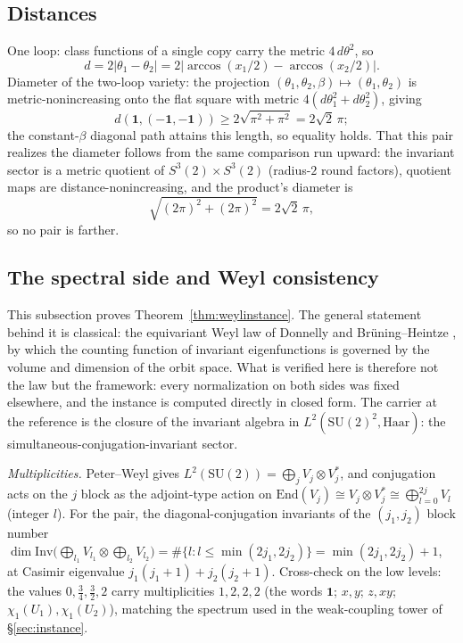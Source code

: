 \documentclass[11pt]{article}
\theoremstyle{definition}
\theoremstyle{remark}
\begin{document}
\subsection{Distances}\label{app:distances}
One loop: class functions of a single copy carry the metric
$4\,d\theta^2$, so
\[
d = 2|\theta_1 - \theta_2|
  = 2|\arccos(x_1/2) - \arccos(x_2/2)|.
\]
Diameter of the two-loop variety: the projection
$(\theta_1,\theta_2,\beta) \mapsto (\theta_1,\theta_2)$ is
metric-nonincreasing onto the flat square with metric $4(d\theta_1^2 +
d\theta_2^2)$, giving
\[
d(\mathbf 1, (-\mathbf 1,-\mathbf 1))
  \ge 2\sqrt{\pi^2 + \pi^2} = 2\sqrt2\,\pi;
\]
the constant-$\beta$ diagonal
path attains this length, so equality holds.  That this pair realizes
the diameter follows from the same comparison run upward: the
invariant sector is a metric quotient of $S^3(2)\times S^3(2)$
(radius-$2$ round factors), quotient maps are distance-nonincreasing,
and the product's diameter is
\[
\sqrt{(2\pi)^2 + (2\pi)^2} = 2\sqrt2\,\pi,
\]
so no pair is farther.

\subsection{The spectral side and Weyl consistency}\label{app:weyl}
This subsection proves Theorem~\ref{thm:weylinstance}.  The general
statement behind it is classical: the equivariant Weyl law of
Donnelly and Br\"uning--Heintze \cite{donnelly,bruningheintze},
by which the counting function of invariant eigenfunctions is
governed by the volume and dimension of the orbit space.  What is
verified here is therefore not the law but the framework: every
normalization on both sides was fixed elsewhere, and the instance is
computed directly in closed form.  The carrier at
the reference is the closure of the invariant algebra in
$L^2(\mathrm{SU}(2)^2, \mathrm{Haar})$: the
simultaneous-conjugation-invariant sector.

\emph{Multiplicities.}  Peter--Weyl gives $L^2(\mathrm{SU}(2)) =
\bigoplus_j V_j \otimes V_j^*$, and conjugation acts on the $j$ block
as the adjoint-type action on $\mathrm{End}(V_j) \cong V_j \otimes
V_j^* \cong \bigoplus_{l=0}^{2j} V_l$ (integer $l$).  For the pair, the
diagonal-conjugation invariants of the $(j_1,j_2)$ block number
$\dim\mathrm{Inv}\big(\textstyle\bigoplus_{l_1} V_{l_1} \otimes
\bigoplus_{l_2} V_{l_2}\big) = \#\{l : l \le \min(2j_1, 2j_2)\} =
\min(2j_1,2j_2)+1$, at Casimir eigenvalue $j_1(j_1{+}1) +
j_2(j_2{+}1)$.  Cross-check on the low levels: the values $0, \tfrac34,
\tfrac32, 2$ carry multiplicities $1, 2, 2, 2$ (the words $\mathbf 1$;
$x, y$; $z, xy$; $\chi_1(U_1), \chi_1(U_2)$), matching the spectrum
used in the weak-coupling tower of \S\ref{sec:instance}.
\end{document}

